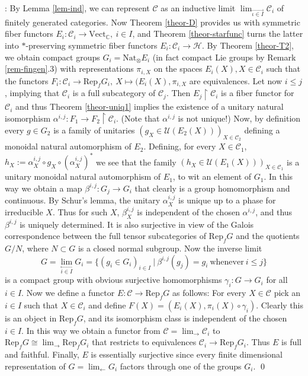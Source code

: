 \documentclass[11pt]{article}
\theoremstyle{definition}
\theoremstyle{definition}
\theoremstyle{remark}
\newcommand{\Vect}{\mathrm{Vect}}
\newcommand{\restr}{\upharpoonright}
\def\2#1{{\mathcal #1}}
\def\7#1{{\mathbb #1}}
\newcommand{\Rep}{\mathrm{Rep}}
\newcommand{\rarr}{\rightarrow}
\newcommand{\Nat}{\mathrm{Nat}}
\begin{document}
: By Lemma
\ref{lem-ind}, we can represent $\2C$ as an inductive limit
$\lim_{\stackrel{\longrightarrow}{\iota\in I}}\2C_i$ of finitely
generated categories.  Now Theorem \ref{theor-D} provides us with
symmetric fiber functors $E_i:\2C_i\rarr\Vect_\7C,\ i\in I$, and
Theorem \ref{theor-starfunc} turns the latter into $*$-preserving
symmetric fiber functors $E_i:\2C_i\rarr\2H$. By Theorem
\ref{theor-T2}, we obtain compact groups $G_i=\Nat_\otimes E_i$ (in
fact compact Lie groups by Remark \ref{rem-fingen}.3) with
representations $\pi_{i,X}$ on the spaces $E_i(X),X\in\2C_i$ such that
the functors $F_i: \2C_i\rarr\Rep_fG_i,\ X\mapsto(E_i(X),\pi_{i,X}$
are equivalences. Let now $i\le j$, implying that $\2C_i$ is a full
subcategory of $\2C_j$. Then $E_j\restr\2C_i$ is a fiber functor for
$\2C_i$ and thus Theorem \ref{theor-uniq1} implies the existence of a
unitary natural isomorphism $\alpha^{i,j}: F_1\rarr F_2\restr\2C_i$.
(Note that $\alpha^{i,j}$ is not unique!) Now, by definition every
$g\in G_2$ is a family of unitaries $(g_X\in\2U(E_2(X)))_{X\in\2C_2}$
defining a monoidal natural automorphism of $E_2$. Defining, for every
$X\in\2C_1$, $h_X:=\alpha^{i,j}_X\circ g_X\circ(\alpha^{i,j}_X)^*$ we
see that the family $(h_X\in\2U(E_1(X)))_{X\in\2C_1}$ is a unitary
monoidal natural automorphism of $E_1$, to wit an element of $G_1$. In
this way we obtain a map $\beta^{i,j}: G_j\rarr G_i$ that clearly is a
group homomorphism and continuous. By Schur's lemma, the unitary
$\alpha^{i,j}_X$ is unique up to a phase for irreducible $X$. Thus for
such $X$, $\beta^{i,j}_X$ is independent of the chosen $\alpha^{i,j}$,
and thus $\beta^{i,j}$ is uniquely determined. It is also surjective
in view of the Galois correspondence between the full tensor
subcategories of $\Rep_fG$ and the quotients $G/N$, where $N\subset G$
is a closed normal subgroup. Now the inverse limit
\[ G=\lim_{\stackrel{\longleftarrow}{i\in I}} G_i = \{ (g_i\in
G_i)_{i\in I}\ | \ \beta^{i,j}(g_j)=g_i\ \mathrm{whenever}\ i\le j \}
\] is a compact group with obvious surjective homomorphisms
$\gamma_i:G\rarr G_i$ for all $i\in I$.  Now we define a functor $E:
\2C\rarr\Rep_fG$ as follows: For every $X\in\2C$ pick an $i\in I$ such
that $X\in\2C_i$ and define $F(X)=(E_i(X),\pi_i(X)\circ\gamma_i)$.
Clearly this is an object in $\Rep_fG$, and its isomorphism class is
independent of the chosen $i\in I$. In this way we obtain a functor
from $\2C=\lim_\rightarrow\2C_i$ to
$\Rep_fG\cong\lim_\rightarrow\Rep_fG_i$ that restricts to equivalences
$\2C_i\rarr\Rep_fG_i$. Thus $E$ is full and faithful. Finally, $E$ is
essentially surjective since every finite dimensional representation
of $G=\lim_\leftarrow G_i$ factors through one of the groups $G_i$.
\qed
\end{document}
